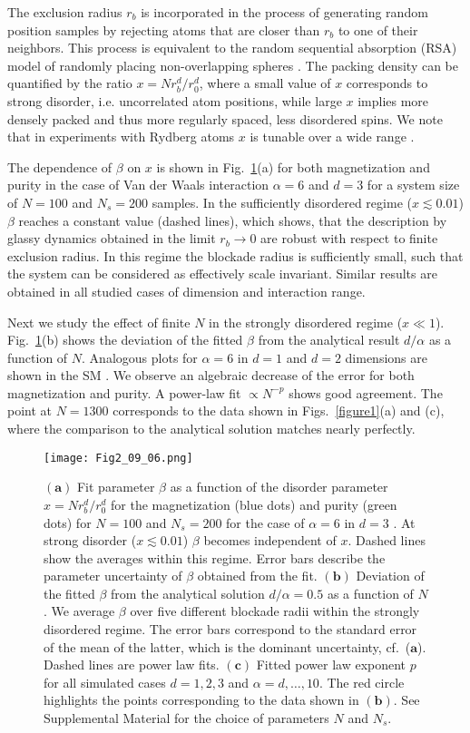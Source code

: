 \documentclass[aps,twocolumn,
superscriptaddress,
footinbib,
prl]{revtex4-1}
\begin{document}
The exclusion radius $r_b$ is incorporated in the process of generating random position samples by rejecting atoms that are closer than $r_b$ to one of their neighbors. This process is equivalent to the random sequential absorption (RSA) model of randomly placing non-overlapping spheres \cite{Adamczyk1996, Hinrichsen1990}. The packing density can be quantified by the ratio $x = N r_b^d/r_0^d$, where a small value of $x$ corresponds to strong disorder, i.e. uncorrelated atom positions, while large $x$ implies more densely packed and thus more regularly spaced, less disordered spins. 
We note that in experiments with Rydberg atoms $x$ is tunable over a wide range \cite{Signoles2021GlassySystem}.

The dependence of $\beta$ on $x$ is shown in Fig.~\ref{figure2}(a) for both magnetization and purity in the case of Van der Waals interaction $\alpha = 6$ and $d = 3$ for a system size of $N=100$ and $N_s=200$ samples. In the sufficiently disordered regime ($x \lesssim 0.01$) $\beta$ reaches a constant value (dashed lines), which shows, that the description by glassy dynamics obtained in the limit $r_b \to 0$ are robust with respect to finite exclusion radius. In this regime the blockade radius is sufficiently small, such that the system can be considered as effectively scale invariant. Similar results are obtained in all studied cases of dimension and interaction range.

Next we study the effect of finite $N$ in the strongly disordered regime ($x\ll 1$). Fig.~\ref{figure2}(b) shows the deviation of the fitted $\beta$ from the analytical result $d/\alpha$ as a function of $N$. Analogous plots for $\alpha=6$ in $d=1$ and $d=2$ dimensions are shown in the SM \cite{SM}. We observe an algebraic decrease of the error for both magnetization and purity. A power-law fit $\propto N^{-p}$ shows good agreement. The point at $N=1300$ corresponds to the data shown in Figs.~\ref{figure1}(a) and (c), where the comparison to the analytical solution matches nearly perfectly. 

\begin{figure}[h!]
\texttt{[image: Fig2\_09\_06.png]}
\caption{$\bm{(a)}$ Fit parameter $\beta$ as a function of the disorder parameter $x = N r_b^d/r_0^d$ for the magnetization (blue dots) and purity (green dots) for $N = 100$ and $N_s=200$ for the case of $\alpha = 6$ in $d=3$ . At strong disorder ($x \lesssim 0.01$) $\beta$ becomes independent of $x$. Dashed lines show the averages within this regime. Error bars describe the parameter uncertainty of $\beta$ obtained from the fit. $\bm{(b)}$ Deviation of the fitted $\beta$ from the analytical solution $d/\alpha = 0.5$ as a function of $N$. We average $\beta$ over five different blockade radii within the strongly disordered regime. The error bars correspond to the standard error of the mean of the latter, which is the dominant uncertainty, cf.~($\bm{a}$). Dashed lines are power law fits. $\bm{(c)}$ Fitted power law exponent $p$ for all simulated cases $d=1,2,3$ and $\alpha = d,\dots,10$. The red circle highlights the points corresponding to the data shown in $\bm{(b)}$. See Supplemental Material for the choice of parameters $N$ and $N_s$. 
}
\label{figure2}
\end{figure}
\end{document}
